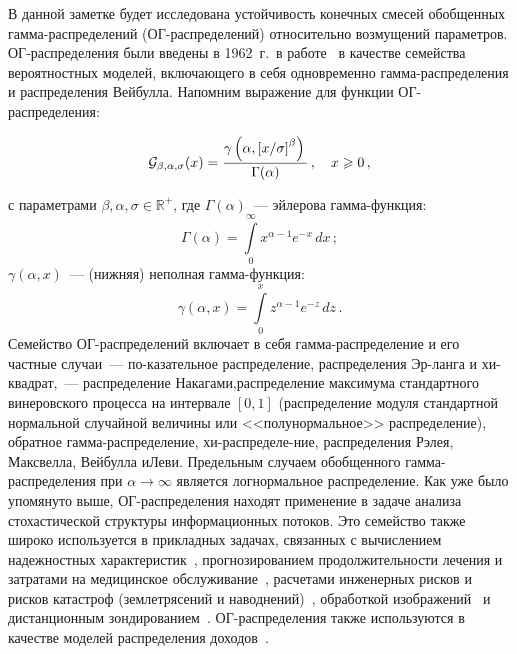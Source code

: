 \begin{multicols}{2}
В данной заметке будет исследована устойчивость конечных смесей
обобщенных гамма-рас\-преде\-ле\-ний (ОГ-рас\-пре\-де\-ле\-ний)
относительно возмущений параметров. ОГ-рас\-пре\-де\-ле\-ния были\linebreak
введены в 1962~г.\ в работе~\cite{St} в качестве семейства
вероятностных моделей, включающего в себя одновременно
гам\-ма-рас\-пре\-де\-ле\-ния и распределения Вейбулла. Напомним выражение
для функции ОГ-рас\-пре\-де\-ле\-ния:

\vspace*{-6pt}

\noindent
\begin{equation}
{\mathcal G}_{\beta,\alpha,\sigma}(x) =
\displaystyle\frac{\displaystyle \gamma\left(\alpha,\left[{x}/{\sigma}\right]^{\beta}\right)\mathstrut}{\displaystyle \Gamma(\alpha)\mathstrut}\,,
\quad x\geqslant 0\,, \label{GGDG}
\end{equation}

\noindent
с параметрами $\beta,\alpha,\sigma\in{\mathbb R}^+$, где
$\Gamma(\alpha)$~--- эйлерова гамма-функция:
$$
\Gamma(\alpha)=\int\limits_0^{\infty}x^{\alpha-1}e^{-x}\,dx\,;
$$
$\gamma(\alpha,x)$~--- (нижняя) неполная гам\-ма-функ\-ция:
$$
\gamma(\alpha,x)=\int\limits_0^xz^{\alpha-1}e^{-z}\,dz\,.
$$
 Семейство ОГ-рас\-пре\-де\-ле\-ний
включает в себя гам\-ма-\-рас\-пре\-де\-ле\-ние и его частные случаи~---
по-\linebreak ка\-за\-тель\-ное распределение, распределения Эр-\linebreak ланга и хи-\-квад\-рат,~--- 
рас\-пре\-де\-ле\-ние Накагами,\linebreak рас\-пре\-деле\-ние максимума стандартного
винеровского процесса на интервале $[0,1]$ (распределение модуля
стандартной нормальной случайной величины или <<полунормальное>>
распределение), обратное гам\-ма-\-рас\-пре\-де\-ле\-ние, хи-рас\-пре\-де\-ле-\linebreak ние,
распределения Рэлея, Максвелла, Вейбулла и\linebreak Леви. Предельным
случаем обобщенного гам\-ма-\linebreak рас\-пре\-де\-ле\-ния при $\alpha\to\infty$
является логнормальное распределение. Как уже было упомянуто выше,
ОГ-рас\-пре\-де\-ле\-ния находят применение в задаче анализа
стохастической структуры информационных потоков. Это семейство
также широко используется в прикладных задачах, связанных с
вычислением надежностных характеристик~\cite{7, 25},
прогнозированием продолжительности лечения и затратами на
медицинское обслуживание~\cite{25, 6}, расчетами инженерных рисков
и рисков катастроф (землетрясений и наводнений)~\cite{26},
обработкой изображений~\cite{28, 29} и дистанционным зондированием~\cite{30, 31}. 
ОГ-рас\-пре\-де\-ле\-ния также используются в качестве
моделей распределения доходов~\cite{8}.


\end{multicols}
